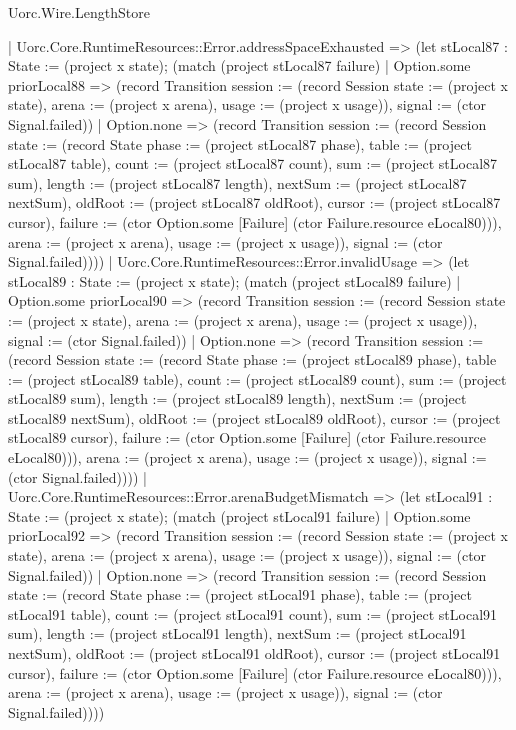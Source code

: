 \begin{lexlean}{Uorc.Wire.LengthStore}
\begin{semanticmodule}
{      | Uorc.Core.RuntimeResources::Error.addressSpaceExhausted => (let stLocal87 : State := (project x state); (match (project stLocal87 failure)
        | Option.some priorLocal88 => (record Transition {session := (record Session {state := (project x state), arena := (project x arena), usage := (project x usage)}), signal := (ctor Signal.failed)})
        | Option.none => (record Transition {session := (record Session {state := (record State {phase := (project stLocal87 phase), table := (project stLocal87 table), count := (project stLocal87 count), sum := (project stLocal87 sum), length := (project stLocal87 length), nextSum := (project stLocal87 nextSum), oldRoot := (project stLocal87 oldRoot), cursor := (project stLocal87 cursor), failure := (ctor Option.some [Failure] (ctor Failure.resource eLocal80))}), arena := (project x arena), usage := (project x usage)}), signal := (ctor Signal.failed)})))
      | Uorc.Core.RuntimeResources::Error.invalidUsage => (let stLocal89 : State := (project x state); (match (project stLocal89 failure)
        | Option.some priorLocal90 => (record Transition {session := (record Session {state := (project x state), arena := (project x arena), usage := (project x usage)}), signal := (ctor Signal.failed)})
        | Option.none => (record Transition {session := (record Session {state := (record State {phase := (project stLocal89 phase), table := (project stLocal89 table), count := (project stLocal89 count), sum := (project stLocal89 sum), length := (project stLocal89 length), nextSum := (project stLocal89 nextSum), oldRoot := (project stLocal89 oldRoot), cursor := (project stLocal89 cursor), failure := (ctor Option.some [Failure] (ctor Failure.resource eLocal80))}), arena := (project x arena), usage := (project x usage)}), signal := (ctor Signal.failed)})))
      | Uorc.Core.RuntimeResources::Error.arenaBudgetMismatch => (let stLocal91 : State := (project x state); (match (project stLocal91 failure)
        | Option.some priorLocal92 => (record Transition {session := (record Session {state := (project x state), arena := (project x arena), usage := (project x usage)}), signal := (ctor Signal.failed)})
        | Option.none => (record Transition {session := (record Session {state := (record State {phase := (project stLocal91 phase), table := (project stLocal91 table), count := (project stLocal91 count), sum := (project stLocal91 sum), length := (project stLocal91 length), nextSum := (project stLocal91 nextSum), oldRoot := (project stLocal91 oldRoot), cursor := (project stLocal91 cursor), failure := (ctor Option.some [Failure] (ctor Failure.resource eLocal80))}), arena := (project x arena), usage := (project x usage)}), signal := (ctor Signal.failed)})))
}
\end{semanticmodule}
\end{lexlean}
